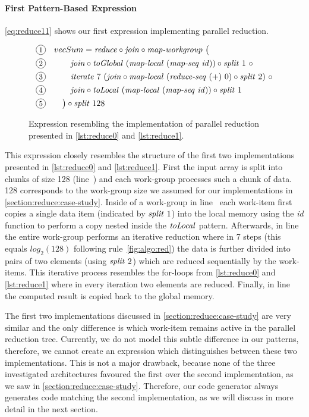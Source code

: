 \paragraph{First Pattern-Based Expression}
\autoref{eq:reduce11} shows our first expression implementing parallel reduction.
\begin{figure}
  \begin{align*}
    \lineNum{1}&
      \quad vecSum = \reduce \circ \join \circ \mapWorkgroup\ \big(\\
    \lineNum{2}&
      \qquad\quad \join \circ \toGlobal\ (\mapLocal\ (\mapSeq\ \id)) \circ \splitN\ 1\ \circ\\
    \lineNum{3}&
      \qquad\quad\iterateN\ 7\ (\join \circ \mapLocal\ (\reduceSeq\ (+)\ 0) \circ \splitN\ 2)\ \circ\\
    \lineNum{4}&
      \qquad\quad \join \circ \toLocal\ (\mapLocal\ (\mapSeq\ \id)) \circ \splitN\ 1\\
    \lineNum{5}&
      \qquad\big) \circ \splitN\ 128
  \end{align*}
  \caption{Expression resembling the implementation of parallel reduction presented in \autoref{lst:reduce0} and \autoref{lst:reduce1}.}
  \label{eq:reduce11}
\end{figure}
%
This expression closely resembles the structure of the first two implementations presented in \autoref{lst:reduce0} and \autoref{lst:reduce1}.
First the input array is split into chunks of size 128 (line~) and each work-group processes such a chunk of data.
128 corresponds to the work-group size we assumed for our implementations in \autoref{section:reduce:case-study}.
Inside of a work-group in line~ each work-item first copies a single data item (indicated by $\text{\textit{split}}\ 1$) into the local memory using the \textit{id} function to perform a copy nested inside the $\text{\textit{toLocal}}$ pattern.
Afterwards, in line~ the entire work-group performs an iterative reduction where in 7 steps (this equals $log_2(128)$ following rule~\ref{fig:algo:red}) the data is further divided into pairs of two elements (using $\text{\textit{split}}\ 2$) which are reduced sequentially by the work-items.
This iterative process resembles the for-loops from \autoref{lst:reduce0} and \autoref{lst:reduce1} where in every iteration two elements are reduced.
Finally, in line~ the computed result is copied back to the global memory.

The first two implementations discussed in \autoref{section:reduce:case-study} are very similar and the only difference is which work-item remains active in the parallel reduction tree.
Currently, we do not model this subtle difference in our patterns, therefore, we cannot create an expression which distinguishes between these two implementations.
This is not a major drawback, because none of the three investigated architectures favoured the first over the second implementation, as we saw in \autoref{section:reduce:case-study}.
Therefore, our code generator always generates code matching the second implementation, as we will discuss in more detail in the next section.


